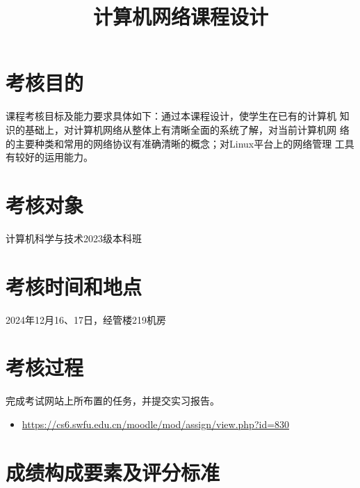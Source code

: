 \documentclass{swfuassessment}
\title{计算机网络课程设计}
\begin{document}
\headone{}

\section{考核目的}

课程考核目标及能力要求具体如下：通过本课程设计，使学生在已有的计算机
知识的基础上，对计算机网络从整体上有清晰全面的系统了解，对当前计算机网
络的主要种类和常用的网络协议有准确清晰的概念；对Linux平台上的网络管理
工具有较好的运用能力。

\section{考核对象}

计算机科学与技术2023级本科班

\section{考核时间和地点}

2024年12月16、17日，经管楼219机房

\section{考核过程}

完成考试网站上所布置的任务，并提交实习报告。

\begin{itemize}
\item \url{https://cs6.swfu.edu.cn/moodle/mod/assign/view.php?id=830}
\end{itemize}

\section{成绩构成要素及评分标准}
\end{document}
